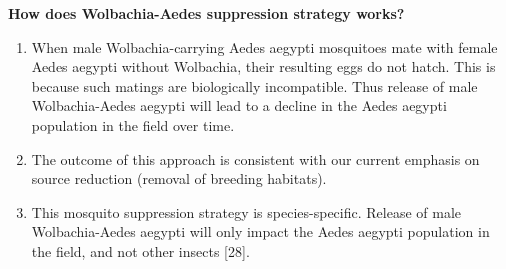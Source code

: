 \documentclass[11pt]{exam}
\begin{document}
\begin{questions}
\textbf{How does Wolbachia-Aedes suppression strategy works?}\\
\begin{enumerate}
\item When male Wolbachia-carrying Aedes aegypti mosquitoes mate with female Aedes aegypti without Wolbachia, their resulting eggs do not hatch. This is because such matings are biologically incompatible. Thus release of male Wolbachia-Aedes aegypti will lead to a decline in the Aedes aegypti population in the field over time.
\item The outcome of this approach is consistent with our current emphasis on source reduction (removal of breeding habitats).
\item This mosquito suppression strategy is species-specific. Release of male Wolbachia-Aedes aegypti will only impact the Aedes aegypti population in the field, and not other insects
[28].
\end {enumerate}

%
%


\end{questions}
\end{document}
